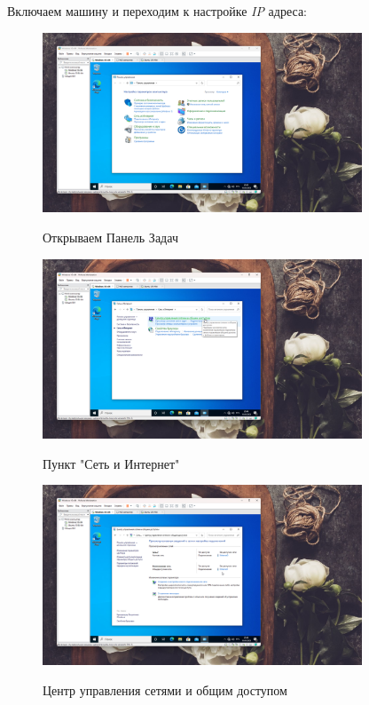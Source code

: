 \documentclass[a4paper]{article}
\begin{document}
  Включаем машину и переходим к настройке \textit{IP} адреса:

  \begin{figure}[H]
    \centering
    \includegraphics[width=0.85\textwidth]{06_00 (64)}
    \label{img:64}
    \caption{Открываем Панель Задач}
  \end{figure}
  
  \begin{figure}[H]
    \centering
    \includegraphics[width=0.85\textwidth]{06_00 (65)}
    \label{img:65}
    \caption{Пункт "Сеть и Интернет"}
  \end{figure}
  
  \begin{figure}[H]
    \centering
    \includegraphics[width=0.85\textwidth]{06_00 (66)}
    \label{img:66}
    \caption{Центр управления сетями и общим доступом}
  \end{figure}
  
\end{document}
